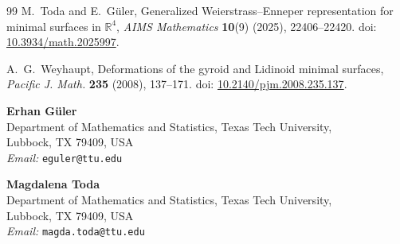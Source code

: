 \documentclass[12pt]{article}
\numberwithin{equation}{section}
\theoremstyle{definition}
\theoremstyle{remark}
\begin{document}
\begin{thebibliography}{99}
M.~Toda and E.~G\"uler,
Generalized Weierstrass--Enneper representation for minimal surfaces in $\mathbb{R}^4$,
\textit{AIMS Mathematics} \textbf{10}(9) (2025), 22406--22420.
doi: \href{https://doi.org/10.3934/math.2025997}{10.3934/math.2025997}.

A.~G.~Weyhaupt,
Deformations of the gyroid and Lidinoid minimal surfaces,
\textit{Pacific J. Math.} \textbf{235} (2008), 137--171.
doi: \href{https://doi.org/10.2140/pjm.2008.235.137}{10.2140/pjm.2008.235.137}.





\end{thebibliography}

\bigskip
\noindent
\textbf{Erhan G\"uler}\\
Department of Mathematics and Statistics, Texas Tech University,\\
Lubbock, TX 79409, USA\\
\textit{Email:} \texttt{eguler@ttu.edu}

\bigskip
\noindent
\textbf{Magdalena Toda}\\
Department of Mathematics and Statistics, Texas Tech University,\\
Lubbock, TX 79409, USA\\
\textit{Email:} \texttt{magda.toda@ttu.edu}
\end{document}
